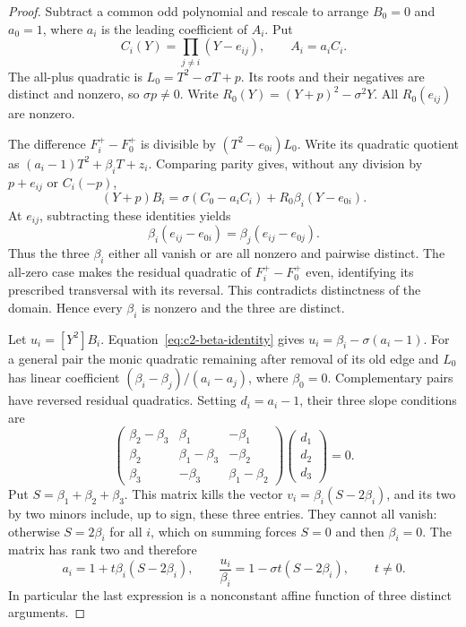 \begin{proof}
Subtract a common odd polynomial and rescale to arrange $B_0=0$ and $a_0=1$,
where $a_i$ is the leading coefficient of $A_i$. Put
\[
 C_i(Y)=\prod_{j\ne i}(Y-e_{ij}),\qquad A_i=a_iC_i.
\]
The all-plus quadratic is $L_0=T^2-\sigma T+p$. Its roots and their negatives
are distinct and nonzero, so $\sigma p\ne0$. Write
$R_0(Y)=(Y+p)^2-\sigma^2Y$. All $R_0(e_{ij})$ are nonzero.

The difference $F_i^+-F_0^+$ is divisible by $(T^2-e_{0i})L_0$.
Write its quadratic quotient as
$(a_i-1)T^2+\beta_iT+z_i$. Comparing parity gives, without any division by
$p+e_{ij}$ or $C_i(-p)$,
\begin{equation}\label{eq:c2-beta-identity}
 (Y+p)B_i=\sigma(C_0-a_iC_i)+R_0\beta_i(Y-e_{0i}).
\end{equation}
At $e_{ij}$, subtracting these identities yields
\begin{equation}\label{eq:c2-beta-edge}
 \beta_i(e_{ij}-e_{0i})=\beta_j(e_{ij}-e_{0j}).
\end{equation}
Thus the three $\beta_i$ either all vanish or are all nonzero and pairwise
distinct. The all-zero case makes the residual quadratic of $F_i^+-F_0^+$
even, identifying its prescribed transversal with its reversal. This
contradicts distinctness of the domain. Hence every $\beta_i$ is nonzero
and the three are distinct.

Let $u_i=[Y^2]B_i$. Equation~\eqref{eq:c2-beta-identity} gives
$u_i=\beta_i-\sigma(a_i-1)$. For a general pair the monic quadratic
remaining after removal of its old edge and $L_0$ has linear coefficient
$(\beta_i-\beta_j)/(a_i-a_j)$, where $\beta_0=0$. Complementary pairs have
reversed residual quadratics. Setting $d_i=a_i-1$, their three slope
conditions are
\[
 \begin{pmatrix}
 \beta_2-\beta_3&\beta_1&-\beta_1\\
 \beta_2&\beta_1-\beta_3&-\beta_2\\
 \beta_3&-\beta_3&\beta_1-\beta_2
 \end{pmatrix}
 \begin{pmatrix}d_1\\d_2\\d_3\end{pmatrix}=0.
\]
Put $S=\beta_1+\beta_2+\beta_3$. This matrix kills the vector
$v_i=\beta_i(S-2\beta_i)$, and its two by two minors include, up to sign,
these three entries. They cannot all vanish: otherwise $S=2\beta_i$ for
all $i$, which on summing forces $S=0$ and then $\beta_i=0$.
The matrix has rank two and therefore
\begin{equation}\label{eq:c2-amplitudes}
 a_i=1+t\beta_i(S-2\beta_i),\qquad
 \frac{u_i}{\beta_i}=1-\sigma t(S-2\beta_i),\qquad t\ne0.
\end{equation}
In particular the last expression is a nonconstant affine function of
three distinct arguments.


\end{proof}
